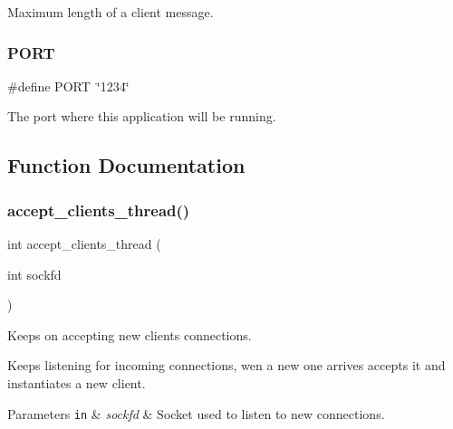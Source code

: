 Maximum length of a client message. 

\mbox{\label{zip-zop-server_8c_a614217d263be1fb1a5f76e2ff7be19a2}} 
\subsubsection{\texorpdfstring{P\+O\+RT}{PORT}}
{\footnotesize\ttfamily \#define P\+O\+RT~\char`\"{}1234\char`\"{}}



The port where this application will be running. 



\subsection{Function Documentation}
\mbox{\label{zip-zop-server_8c_aecda02796082ba70b0c51545862d03a6}} 
\subsubsection{\texorpdfstring{accept\+\_\+clients\+\_\+thread()}{accept\_clients\_thread()}}
{\footnotesize\ttfamily int accept\+\_\+clients\+\_\+thread (\begin{DoxyParamCaption}\item[{int}]{sockfd }\end{DoxyParamCaption})}



Keeps on accepting new clients connections. 

Keeps listening for incoming connections, wen a new one arrives accepts it and instantiates a new client.


\begin{DoxyParams}[1]{Parameters}
\mbox{\tt in}  & {\em sockfd} & Socket used to listen to new connections. \\
\hline
\end{DoxyParams}
\mbox{\label{zip-zop-server_8c_a36e911ded647a0697ca152cae890bcf5}} 
